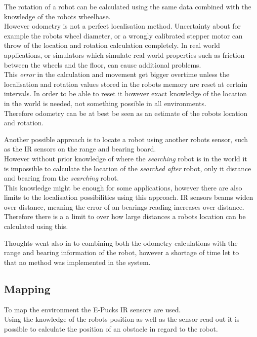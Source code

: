 The rotation of a robot can be calculated using the same data combined with the knowledge of the robots wheelbase.\\
However odometry is not a perfect localisation method. Uncertainty about for example the robots wheel diameter, or a wrongly calibrated stepper motor can throw of the location and rotation calculation completely. In real world applications, or simulators which simulate real world properties such as friction between the wheels and the floor, can cause additional problems. \\
This \textit{error} in the calculation and movement get bigger overtime unless the localisation and rotation values stored in the robots memory are reset at certain intervals. In order to be able to reset it however exact knowledge of the location in the world is needed, not something possible in all environments.\\
Therefore odometry can be at best be seen as an estimate of the robots location and rotation. 

Another possible approach is to locate a robot using another robots sensor, such as the IR sensors on the range and bearing board. \\
However without prior knowledge of where the \textit{searching} robot is in the world it is impossible to calculate the location of the \textit{searched after} robot, only it distance and bearing from the \textit{searching} robot. \\
This knowledge might be enough for some applications, however there are also limits to the localisation possibilities using this approach.
IR sensors beams widen over distance, meaning the error of an bearings reading increases over distance. Therefore there is a a limit to over how large distances a robots location can be calculated using this. 

Thoughts went also in to combining both the odometry calculations with the range and bearing information of the robot, however a shortage of time let to that no method was implemented in the system. 


\subsection{Mapping}
To map the environment the E-Pucks IR sensors are used. \\
Using the knowledge of the robots position as well as the sensor read out it is possible to calculate the position of an obstacle in regard to the robot. \\

